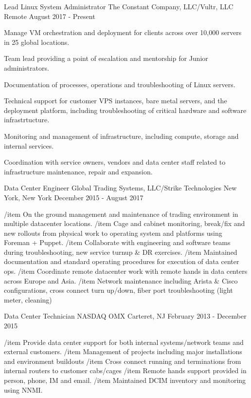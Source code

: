 
\begin{cventries}

	\cventry
	{Lead Linux System Administrator}
	{The Constant Company, LLC/Vultr, LLC}
	{Remote}
	{August 2017 - Present}
	{
		\begin{cvitems}
		\item {Manage VM orchestration and deployment for clients across over 10,000 servers in 25 global locations.}
		\item {Team lead providing a point of escalation and mentorship for Junior administrators.}
		\item {Documentation of processes, operations and troubleshooting of Linux servers.}
		\item {Technical support for customer VPS instances, bare metal servers, and the deployment platform, including troubleshooting of critical hardware and software infrastrtucture.}
		\item {Monitoring and management of infrastructure, including compute, storage and internal services.}
		\item {Coordination with service owners, vendors and data center staff related to infrastructure maintenance, repair and expansion.}
		\end{cvitems}
	}


	\cventry
	{Data Center Engineer}
	{Global Trading Systems, LLC/Strike Technologies}
	{New York, New York}
	{December 2015 - August 2017}
	{
		\begin{cvitems}
		/item {On the ground management and maintenance of trading environment in multiple datacenter locations.}
		/item {Cage and cabinet monitoring, break/fix and new rollouts from physical work to operating system and platforms using Foreman + Puppet.}
		/item {Collaborate with engineering and software teams during troubleshooting, new service turnup & DR exercises.}
		/item {Maintained documentation and standard operating procedures for execution of data center ops.}
		/item {Coordinate remote datacenter work with remote hands in data centers across Europe and Asia.}
		/item {Network maintenance including Arista & Cisco configurations, cross connect turn up/down, fiber port troubleshooting (light meter, cleaning)}
		\end{cvitems}
	}


	\cventry
	{Data Center Technician}
	{NASDAQ OMX}
	{Carteret, NJ}
	{February 2013 - December 2015}
	{
		\begin{cvitems}
		/item {Provide data center support for both internal systems/network teams and external customers.}
		/item {Management of projects including major installations and environment buildouts}
		/item {Cross connect running and terminations from internal routers to customer cabs/cages}
		/item {Remote hands support provided in person, phone, IM and email.}
		/item {Maintained DCIM inventory and monitoring using NNMI.}
		\end{cvitems}
	}

\end{cventries}

